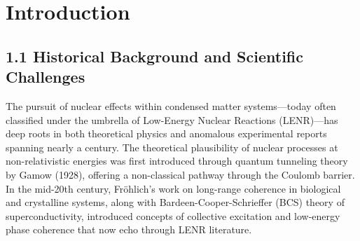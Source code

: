 \begin{abstract}
    Low-Energy Nuclear Reactions (LENR), characterized by anomalous heat generation and nuclear byproducts occurring under non-relativistic conditions, continue to defy conventional nuclear theory. Though historically marginalized since the Fleischmann–Pons announcement in 1989, evidence of excess heat, transmutation products, and helium-4 production has persisted in both deuterium–palladium and nickel–hydrogen systems. 
    
    We present a unified, hierarchical theoretical framework that integrates over a century of developments in quantum tunneling, electron screening, interface electrodynamics, and collective lattice phenomena. Drawing from both historical antecedents (e.g., Gamow tunneling, Fröhlich coherence, Preparata’s QED domains) and modern models (e.g., Takahashi’s tetrahedral fusion, Hagelstein’s phonon-nuclear coupling), we revise tunneling enhancement estimates downward to $10^3$–$10^5$, yet demonstrate their sufficiency under macroscopic interaction densities.
    
    A quantitative reanalysis is performed using a coupled Poisson–Schrödinger framework with Monte Carlo uncertainty propagation and Sobol sensitivity metrics. This theoretical model is critically correlated with key calorimetric and isotopic results from both legacy data (EPRI–NSF 1989) and recent high-resolution experiments in Ni–H and Pd–D systems. 
    
    This work aims to advance LENR toward scientific legitimacy by integrating theoretical consistency, historical context, and a reproducible experimental roadmap while acknowledging the open challenge of bridging the nuclear energy gap.
    \end{abstract}
    
    \section{Introduction}
    
    \subsection{1.1 Historical Background and Scientific Challenges}
    
    The pursuit of nuclear effects within condensed matter systems—today often classified under the umbrella of Low-Energy Nuclear Reactions (LENR)—has deep roots in both theoretical physics and anomalous experimental reports spanning nearly a century. The theoretical plausibility of nuclear processes at non-relativistic energies was first introduced through quantum tunneling theory by Gamow (1928), offering a non-classical pathway through the Coulomb barrier. In the mid-20th century, Fröhlich’s work on long-range coherence in biological and crystalline systems, along with Bardeen-Cooper-Schrieffer (BCS) theory of superconductivity, introduced concepts of collective excitation and low-energy phase coherence that now echo through LENR literature.
    
